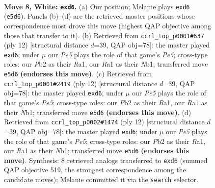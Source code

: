 \documentclass[11pt]{article}
\begin{document}
\begin{figure}[p]\centering
\begin{subfigure}{0.46\textwidth}\centering
\resizebox{\linewidth}{!}{%
\newchessgame
\chessboard[
  setfen={rnbqk2r/ppp1ppb1/1n1p2p1/4P2p/3P4/1B3N2/PPP2PPP/RNBQK1R1 w Qkq - 0 8},
  showmover=false,
  pgfstyle=straightmove, color=movearrow, markmove={e5-d6}
]}
\caption{}
\end{subfigure}\hfill
\begin{subfigure}{0.46\textwidth}\centering
\resizebox{\linewidth}{!}{%
\newchessgame
\chessboard[
  setfen={rnbqk2r/ppp1ppbp/1n1p2p1/4P3/2PP4/5N2/PP2BPPP/RNBQK2R w KQkq - 1 7},
  showmover=false,
  pgfstyle=straightmove, color=movearrow, markmove={e5-d6}
]}
\caption{}
\end{subfigure}
\\[4pt]
\begin{subfigure}{0.46\textwidth}\centering
\resizebox{\linewidth}{!}{%
\newchessgame
\chessboard[
  setfen={rnbqk2r/ppp1ppbp/1n1p2p1/4P3/2PP4/5N2/PP2BPPP/RNBQK2R w KQkq - 1 7},
  showmover=false,
  pgfstyle=straightmove, color=movearrow, markmove={e5-d6}
]}
\caption{}
\end{subfigure}\hfill
\begin{subfigure}{0.46\textwidth}\centering
\resizebox{\linewidth}{!}{%
\newchessgame
\chessboard[
  setfen={rnbqk2r/ppp1ppbp/1n1p2p1/4P3/2PP4/5N2/PP2BPPP/RNBQK2R w KQkq - 3 7},
  showmover=false,
  pgfstyle=straightmove, color=movearrow, markmove={e5-d6}
]}
\caption{}
\end{subfigure}
\caption{\textbf{Move 8, White: \texttt{exd6}.} (a) Our position; Melanie plays \texttt{exd6} (\texttt{e5d6}). Panels (b)--(d) are the retrieved master positions whose correspondence most drove this move (highest QAP objective among those that transfer to it). (b) Retrieved from \texttt{ccrl\_top\_p0001\#637} (ply 12) [structural distance $d$=39, QAP obj=78]: the master played \texttt{exd6}; under $\mu$ our \emph{Pe5} plays the role of that game's \emph{Pe5}; cross-type roles: our \emph{P}b2 as their \emph{R}a1, our \emph{R}a1 as their \emph{N}b1; transferred move \texttt{e5d6} \textbf{(endorses this move)}. (c) Retrieved from \texttt{ccrl\_top\_p0001\#2419} (ply 12) [structural distance $d$=39, QAP obj=78]: the master played \texttt{exd6}; under $\mu$ our \emph{Pe5} plays the role of that game's \emph{Pe5}; cross-type roles: our \emph{P}b2 as their \emph{R}a1, our \emph{R}a1 as their \emph{N}b1; transferred move \texttt{e5d6} \textbf{(endorses this move)}. (d) Retrieved from \texttt{ccrl\_top\_p0002\#1474} (ply 12) [structural distance $d$=39, QAP obj=78]: the master played \texttt{exd6}; under $\mu$ our \emph{Pe5} plays the role of that game's \emph{Pe5}; cross-type roles: our \emph{P}b2 as their \emph{R}a1, our \emph{R}a1 as their \emph{N}b1; transferred move \texttt{e5d6} \textbf{(endorses this move)}. Synthesis: 8 retrieved analogs transferred to \texttt{exd6} (summed QAP objective 519, the strongest correspondence among the candidate moves); Melanie committed it via the \texttt{search} selector.}
\label{fig:thought-m14}
\end{figure}
\end{document}
